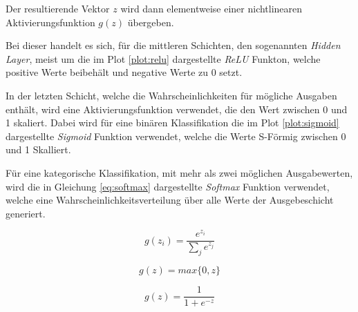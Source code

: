 Der resultierende Vektor $z$ wird dann elementweise
einer nichtlinearen Aktivierungsfunktion $g(z)$ übergeben.

Bei dieser handelt es sich, für die mittleren Schichten, 
den sogenannten \textit{Hidden Layer},  
meist um die im Plot \ref{plot:relu} dargestellte \textit{ReLU} Funkton,
welche positive Werte beibehält und negative 
Werte zu 0 setzt.

In der letzten Schicht, welche die Wahrscheinlichkeiten 
für mögliche Ausgaben enthält, wird eine Aktivierungsfunktion
verwendet, die den Wert zwischen 0 und 1 
skaliert.
Dabei wird für eine binären Klassifikation die 
im Plot \ref{plot:sigmoid} dargestellte \textit{Sigmoid} 
Funktion verwendet, welche die Werte S-Förmig zwischen 
0 und 1 Skalliert.

Für eine kategorische Klassifikation, 
mit mehr als zwei möglichen Ausgabewerten, 
wird die in Gleichung 
\ref{eq:softmax} dargestellte \textit{Softmax} Funktion 
verwendet, welche 
eine Wahrscheinlichkeitsverteilung
über alle Werte der Ausgebeschicht generiert.

\begin{equation}
    \label{eq:softmax}
    g(z_{i}) = \frac{e^{z_{i}}}{\sum_{j} e^{z_{j}}}
\end{equation}
\newpage
\begin{minipage}{0.5\textwidth}
    \centering
    \begin{equation*}
        \label{eq:relu}
        g(z) = max\{0,z\}
    \end{equation*}
\end{minipage}
\vspace{1cm}
\begin{minipage}{0.5\textwidth}
    \centering
    \begin{equation*}
        \label{eq:sidmoid}
        g(z) = \frac{1}{1 + e^{-z}}
    \end{equation*}    
\end{minipage}
\begin{minipage}{0.5\textwidth}
    \centering
    
    \label{plot:relu}
\end{minipage}
\begin{minipage}{0.5\textwidth}
    \centering
    
    \label{plot:sigmoid}
\end{minipage}
\vspace{1cm}




